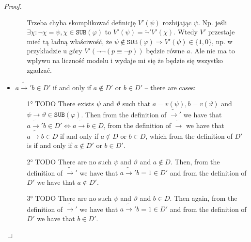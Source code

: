 \documentclass{article}
\theoremstyle{definition}
\theoremstyle{definition}
\newcommand*{\id}{\equiv}
\newcommand*{\ra}{\rightarrow}
\newcommand*{\SUB}{\texttt{SUB}}
\begin{document}
\begin{proof}
\begin{itemize}
\begin{enumerate}
{                              Trzeba chyba skomplikować definicję $V'(\psi)$ rozbijając $\psi$. Np. jeśli
                              $\exists \chi: \lnot \chi = \psi, \chi \in \SUB(\varphi)$ to $V'(\psi) =
                                  \tilde{\lnot}'V'(\chi)$. Wtedy $V'$ przestaje mieć tą ładną właściwość, że
                              $\psi \not \in \SUB(\varphi) \Rightarrow V'(\psi) \in \{1, 0\}$, np. w
                              przykładzie u góry $V'(\lnot \lnot (p \id \lnot p))$ będzie równe $a$. Ale nie
                              ma to wpływu na liczność modelu i wydaje mi się że będzie się wszystko zgadzać.
                          }
              \end{enumerate}
        \item $a \tilde{\ra}'b \in D'$ if and only if $a \not \in D'$ or $b \in D'$ -- there are cases:
              \begin{enumerate}
                  \item[1°] TODO There exists $\psi$ and $\vartheta$ such that $a = v(\psi), b=v(\vartheta)$ and $\psi \ra \vartheta \in \SUB(\varphi)$. Then from the definition of $\tilde{\ra}'$ we have that $a \tilde{\ra}'b \in D' \iff a \tilde{\ra} b \in D$, from the definition of $\tilde{\ra}$ we have that $a \tilde{\ra} b \in D$ if and only if $a \not \in D$ or $b \in D$, which from the definition of $D'$ is if and only if $a \not \in D'$ or $b \in D'$.
                  \item[2°] TODO There are no such $\psi$ and $\vartheta$ and $a \not \in D$. Then, from the definition of $\tilde{\ra}'$ we have that $a \tilde{\ra}' b = 1 \in D'$ and from the definition of $D'$ we have that $a \not \in D'$.
                  \item[3°] TODO There are no such $\psi$ and $\vartheta$ and $b \in D$. Then again, from the definition of $\tilde{\ra}'$ we have that $a \tilde{\ra}' b = 1 \in D'$ and from the definition of $D'$ we have that $b \in D'$.
              \end{enumerate}
    \end{itemize}
\end{proof}
\end{document}
